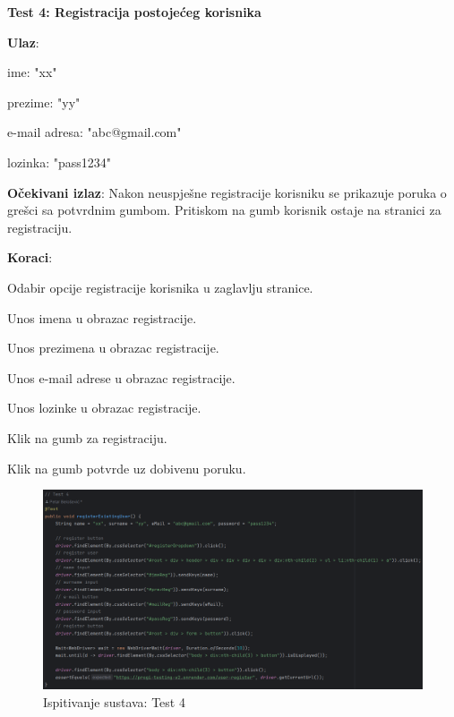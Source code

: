 		 	\textbf{Test 4: Registracija postojećeg korisnika}
		 	
		 	\begin{packed_item} 
		 		\item \textbf{Ulaz}:
		 		\begin{packed_item} 
		 			\item ime: "xx"
		 			\item prezime: "yy"
		 			\item e-mail adresa: "abc@gmail.com"
		 			\item lozinka: "pass1234"
		 		\end{packed_item}
		 		\item \textbf{Očekivani izlaz}: Nakon neuspješne registracije korisniku se prikazuje poruka o grešci sa potvrdnim gumbom. Pritiskom na gumb korisnik ostaje na stranici za registraciju.
		 		\item \textbf{Koraci}:
		 		\begin{packed_enum} 
		 			\item Odabir opcije registracije korisnika u zaglavlju stranice.
		 			\item Unos imena u obrazac registracije.
		 			\item Unos prezimena u obrazac registracije.
		 			\item Unos e-mail adrese u obrazac registracije.
		 			\item Unos lozinke u obrazac registracije.
		 			\item Klik na gumb za registraciju.
		 			\item Klik na gumb potvrde uz dobivenu poruku.
		 		\end{packed_enum}
		 	\end{packed_item}
		 	
		 	\begin{figure}[H]
		 		\includegraphics[width=\textwidth]{slike/SeleniumTest4.png} %
		 		\caption{Ispitivanje sustava: Test 4}
		 		\label{fig:SeleniumTest4} %
		 	\end{figure}
		 	
